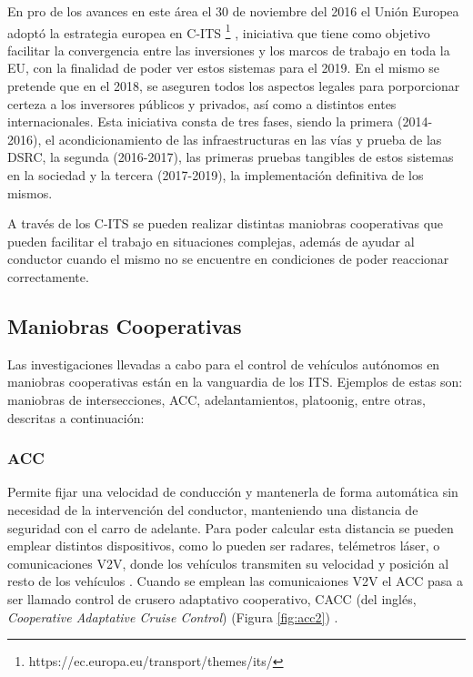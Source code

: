 \par  En pro de los avances en este área el 30 de noviembre del 2016 el Unión Europea adoptó la estrategia europea en C-ITS \footnote{https://ec.europa.eu/transport/themes/its/ } , iniciativa que tiene como objetivo facilitar la convergencia entre las inversiones y los marcos de trabajo en toda la EU, con la finalidad de poder ver estos sistemas para el 2019. En el mismo se pretende que en el 2018, se aseguren todos los aspectos legales para porporcionar certeza a los inversores públicos y privados, así como a distintos entes internacionales. Esta iniciativa consta de tres fases, siendo la primera (2014-2016), el acondicionamiento de las infraestructuras en las vías y prueba de las DSRC, la segunda (2016-2017), las primeras pruebas tangibles de estos sistemas en la sociedad y la tercera (2017-2019), la implementación definitiva de los mismos.\\

\par A través de los C-ITS se pueden realizar distintas maniobras cooperativas que pueden facilitar el trabajo en situaciones complejas, además de ayudar al conductor cuando el mismo no se encuentre en condiciones de poder reaccionar correctamente.           


\subsection{Maniobras Cooperativas}


Las investigaciones llevadas a cabo para el control de vehículos autónomos en maniobras cooperativas están en la vanguardia de los ITS. Ejemplos de estas son: maniobras de intersecciones, ACC, adelantamientos, platoonig, entre otras, descritas a continuación:

\subsubsection{ACC}

Permite fijar una velocidad de conducción y mantenerla de forma automática sin necesidad de la intervención del conductor, manteniendo una distancia de seguridad con el carro de adelante. Para poder calcular esta distancia se pueden emplear distintos dispositivos, como lo pueden ser radares, telémetros láser, o comunicaciones V2V, donde los vehículos transmiten su velocidad y posición  al resto de los vehículos \cite{van2006impact}. Cuando se emplean las comunicaiones V2V el ACC pasa a ser llamado control de crusero adaptativo cooperativo, CACC (del inglés, \textit{Cooperative Adaptative Cruise Control}) (Figura \ref{fig:acc2}) .\\  

